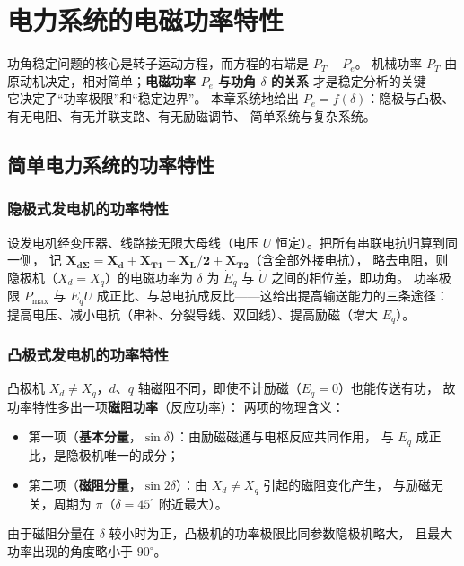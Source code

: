 
\chapter{电力系统的电磁功率特性}

功角稳定问题的核心是转子运动方程，而方程的右端是 $P_T-P_e$。
机械功率 $P_T$ 由原动机决定，相对简单；\textbf{电磁功率 $P_e$ 与功角 $\delta$ 的关系}
才是稳定分析的关键——它决定了“功率极限”和“稳定边界”。
本章系统地给出 $P_e=f(\delta)$：隐极与凸极、有无电阻、有无并联支路、有无励磁调节、
简单系统与复杂系统。

\section{简单电力系统的功率特性}

\subsection{隐极式发电机的功率特性}

设发电机经变压器、线路接无限大母线（电压 $U$ 恒定）。把所有串联电抗归算到同一侧，
记 $\boldsymbol{X_{d\Sigma}=X_d+X_{T1}+X_L/2+X_{T2}}$（含全部外接电抗），
略去电阻，则隐极机（$X_d=X_q$）的电磁功率为
$\delta$ 为 $\dot E_q$ 与 $\dot U$ 之间的相位差，即功角。
功率极限 $P_{\max}$ 与 $E_qU$ 成正比、与总电抗成反比——这给出提高输送能力的三条途径：
提高电压、减小电抗（串补、分裂导线、双回线）、提高励磁（增大 $E_q$）。

\subsection{凸极式发电机的功率特性}

凸极机 $X_d\ne X_q$，$d$、$q$ 轴磁阻不同，即使不计励磁（$E_q=0$）也能传送有功，
故功率特性多出一项\textbf{磁阻功率}（反应功率）：
两项的物理含义：
\begin{itemize}
  \item 第一项（\textbf{基本分量}，$\sin\delta$）：由励磁磁通与电枢反应共同作用，
        与 $E_q$ 成正比，是隐极机唯一的成分；
  \item 第二项（\textbf{磁阻分量}，$\sin2\delta$）：由 $X_d\ne X_q$ 引起的磁阻变化产生，
        与励磁无关，周期为 $\pi$（$\delta=45^\circ$ 附近最大）。
\end{itemize}
由于磁阻分量在 $\delta$ 较小时为正，凸极机的功率极限比同参数隐极机略大，
且最大功率出现的角度略小于 $90^\circ$。

